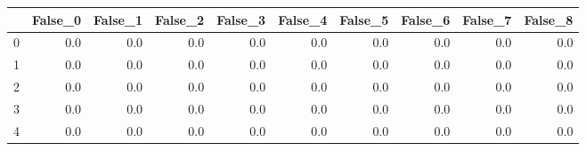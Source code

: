 \begin{tabular}{lrrrrrrrrr}
\toprule
{} &  False\_0 &  False\_1 &  False\_2 &  False\_3 &  False\_4 &  False\_5 &  False\_6 &  False\_7 &  False\_8 \\ \hline
\midrule
0 &      0.0 &      0.0 &      0.0 &      0.0 &      0.0 &      0.0 &      0.0 &      0.0 &      0.0 \\ \hline
1 &      0.0 &      0.0 &      0.0 &      0.0 &      0.0 &      0.0 &      0.0 &      0.0 &      0.0 \\ \hline
2 &      0.0 &      0.0 &      0.0 &      0.0 &      0.0 &      0.0 &      0.0 &      0.0 &      0.0 \\ \hline
3 &      0.0 &      0.0 &      0.0 &      0.0 &      0.0 &      0.0 &      0.0 &      0.0 &      0.0 \\ \hline
4 &      0.0 &      0.0 &      0.0 &      0.0 &      0.0 &      0.0 &      0.0 &      0.0 &      0.0 \\ \hline
\bottomrule
\end{tabular}
